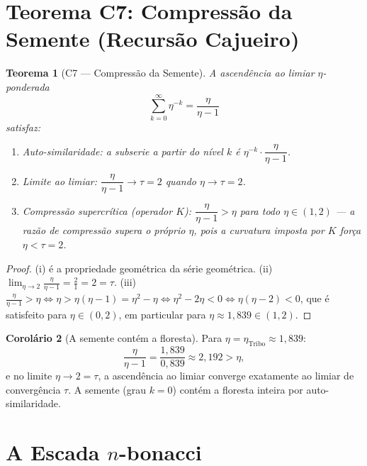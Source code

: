 \documentclass[12pt,a4paper,twoside]{book}
\theoremstyle{plain}
\newtheorem{teorema}{Teorema}[section]
\theoremstyle{definition}
\newtheorem{corolario}[teorema]{Corolário}
\theoremstyle{definition}
\begin{document}
\section{Teorema C7: Compressão da Semente (Recursão Cajueiro)}
\label{sec:C7}

\begin{teorema}[C7 — Compressão da Semente]\label{thm:C7}
A ascendência ao limiar $\eta$-ponderada
\[
  \sum_{k=0}^{\infty} \eta^{-k} = \frac{\eta}{\eta - 1}
\]
satisfaz:
\begin{enumerate}[label=(\roman*)]
  \item Auto-similaridade: a subserie a partir do nível $k$ é
        $\eta^{-k} \cdot \dfrac{\eta}{\eta-1}$.
  \item Limite ao limiar: $\dfrac{\eta}{\eta-1} \to \tau = 2$ quando
        $\eta \to \tau = 2$.
  \item Compressão supercrítica (operador $K$): $\dfrac{\eta}{\eta-1} > \eta$
        para todo $\eta \in (1, 2)$ --- a razão de compressão supera o próprio
        $\eta$, pois a curvatura imposta por $K$ força $\eta < \tau = 2$.
\end{enumerate}
\end{teorema}

\begin{proof}
(i) é a propriedade geométrica da série geométrica.
(ii) $\lim_{\eta \to 2} \frac{\eta}{\eta-1} = \frac{2}{1} = 2 = \tau$.
(iii) $\frac{\eta}{\eta-1} > \eta \iff \eta > \eta(\eta-1) = \eta^{2} - \eta
\iff \eta^{2} - 2\eta < 0 \iff \eta(\eta-2) < 0$, que é satisfeito para
$\eta \in (0,2)$, em particular para $\eta \approx 1{,}839 \in (1,2)$.
\end{proof}

\begin{corolario}[A semente contém a floresta]
Para $\eta = \eta_{\text{Tribo}} \approx 1{,}839$:
\[
  \frac{\eta}{\eta - 1} = \frac{1{,}839}{0{,}839} \approx 2{,}192 > \eta,
\]
e no limite $\eta \to 2 = \tau$, a ascendência ao limiar converge exatamente ao limiar
de convergência $\tau$. A semente (grau $k = 0$) contém a floresta inteira
por auto-similaridade.
\end{corolario}

\section{A Escada $n$-bonacci}
\label{sec:nbonacci}
\end{document}
